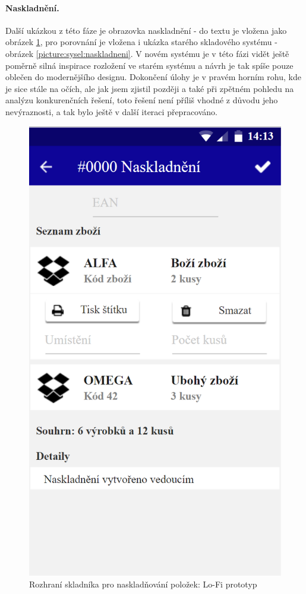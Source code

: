 \paragraph{Naskladnění.} Další ukázkou z této fáze je obrazovka naskladnění - do textu je vložena jako obrázek \ref{picture:axure:naskladneni}, pro porovnání je vložena i ukázka starého skladového systému - obrázek \ref{picture:sysel:naskladneni}. V novém systému je v této fázi vidět ještě poměrně silná inspirace rozložení ve starém systému a návrh je tak spíše pouze oblečen do modernějšího designu. Dokončení úlohy je v pravém horním rohu, kde je sice stále na očích, ale jak jsem zjistil později a také při zpětném pohledu na analýzu konkurenčních řešení, toto řešení není příliš vhodné z důvodu jeho nevýraznosti, a tak bylo ještě v další iteraci přepracováno.\\

\begin{figure}[h]
\includegraphics[height=0.6\textheight]{../png/axure/naskladneni.png}
\caption{Rozhraní skladníka pro naskladňování položek: Lo-Fi prototyp} \label{picture:axure:naskladneni}
\end{figure}

